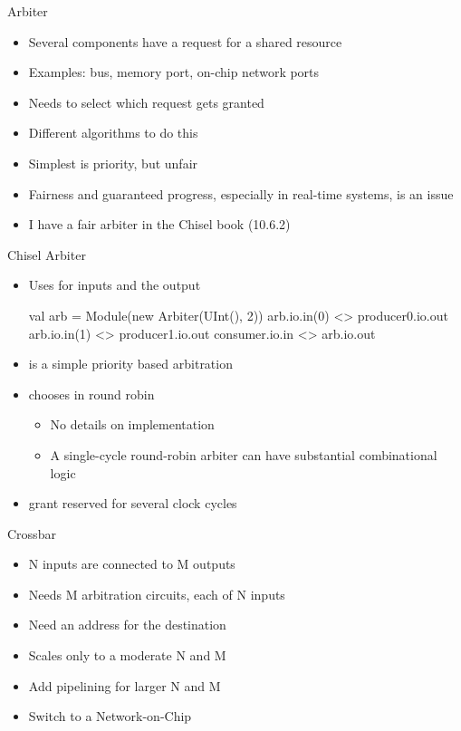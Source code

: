 \begin{frame}[fragile]{Arbiter}
\begin{itemize}
\item Several components have a request for a shared resource
\item Examples: bus, memory port, on-chip network ports
\item Needs to select which request gets granted
\item Different algorithms to do this
\item Simplest is priority, but unfair
\item Fairness and guaranteed progress, especially in real-time systems, is an issue
\item I have a fair arbiter in the Chisel book (10.6.2)
\end{itemize}
\end{frame}

\begin{frame}[fragile]{Chisel Arbiter}
\begin{itemize}
\item Uses  for inputs and the output
\begin{chisel}
val arb = Module(new Arbiter(UInt(), 2))
arb.io.in(0) <> producer0.io.out
arb.io.in(1) <> producer1.io.out
consumer.io.in <> arb.io.out
\end{chisel}
\item {} is a simple priority based arbitration
\item {} chooses in round robin
\begin{itemize}
\item No details on implementation
\item A single-cycle round-robin arbiter can have substantial combinational logic
\end{itemize}
\item {} grant reserved for several clock cycles
\end{itemize}
\end{frame}

\begin{frame}[fragile]{Crossbar}
\begin{itemize}
\item N inputs are connected to M outputs
\item Needs M arbitration circuits, each of N inputs
\item Need an address for the destination
\item Scales only to a moderate N and M
\item Add pipelining for larger N and M
\item Switch to a Network-on-Chip
\end{itemize}
\end{frame}


